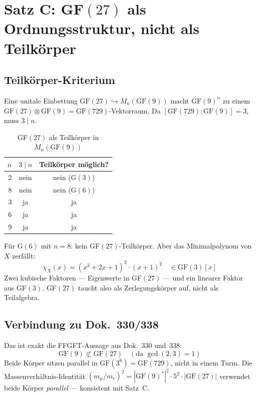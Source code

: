 \section{Satz C: GF$(27)$ als Ordnungsstruktur, nicht als Teilkörper}

\subsection{Teilkörper-Kriterium}

Eine unitale Einbettung $\text{GF}(27) \hookrightarrow M_n(\text{GF}(9))$
macht $\text{GF}(9)^n$ zu einem $\text{GF}(27) \otimes \text{GF}(9) = \text{GF}(729)$-Vektorraum.
Da $[\text{GF}(729):\text{GF}(9)] = 3$, muss $3 \mid n$.

\begin{table}[H]
\centering
\caption{GF$(27)$ als Teilkörper in $M_n(\text{GF}(9))$}
\begin{tabular}{rcc}
\toprule
$n$ & $3 \mid n$ & Teilkörper möglich? \\
\midrule
2 & nein & nein (G$(3)$) \\
8 & nein & nein (G$(6)$) \\
3 & ja & ja \\
6 & ja & ja \\
9 & ja & ja \\
\bottomrule
\end{tabular}
\end{table}

Für G$(6)$ mit $n = 8$: kein GF$(27)$-Teilkörper. Aber das
Minimalpolynom von $X$ zerfällt:
\begin{equation}
  \chi_X(x) = (x^3 + 2x + 1)^2 \cdot (x+1)^2
  \quad \in \text{GF}(3)[x]
\end{equation}
Zwei kubische Faktoren --- Eigenwerte in GF$(27)$ --- und ein linearer Faktor
aus GF$(3)$. GF$(27)$ taucht also als Zerlegungskörper auf, nicht als Teilalgebra.

\subsection{Verbindung zu Dok.~330/338}

Das ist exakt die FFGFT-Aussage aus Dok.~330 und~338:
\begin{equation}
  \text{GF}(9) \not\subset \text{GF}(27) \quad (\text{da } \gcd(2,3) = 1)
\end{equation}
Beide Körper sitzen parallel in $\text{GF}(3^6) = \text{GF}(729)$,
nicht in einem Turm. Die Massenverhältnis-Identität
$(m_\mu/m_e)^2 = |\text{GF}(9)^*|^2 \cdot 5^2 \cdot |\text{GF}(27)|$
verwendet beide Körper \emph{parallel} --- konsistent mit Satz~C.

